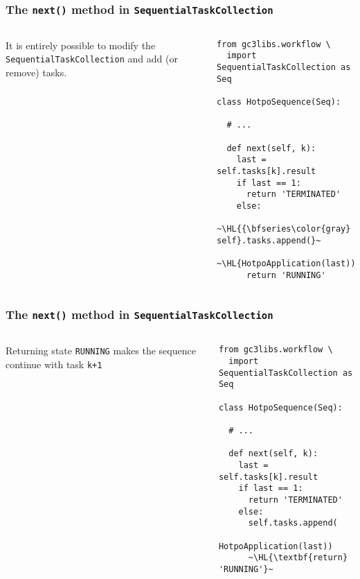 \documentclass[english,serif,mathserif,xcolor=pdftex,dvipsnames,table]{beamer}
\begin{document}
\begin{frame}[fragile]
  \frametitle{The \texttt{next()} method in \texttt{SequentialTaskCollection}}
  \label{sec:14}

  \begin{columns}
    It is entirely possible to modify the
    \texttt{SequentialTaskCollection} and add (or remove) tasks.

    \begin{lstlisting}[basicstyle=\ttfamily\footnotesize]
from gc3libs.workflow \
  import SequentialTaskCollection as Seq

class HotpoSequence(Seq):

  # ...

  def next(self, k):
    last = self.tasks[k].result
    if last == 1:
      return 'TERMINATED'
    else:
      ~\HL{{\bfseries\color{gray} self}.tasks.append(}~
        ~\HL{HotpoApplication(last))}~
      return 'RUNNING'
    \end{lstlisting}
  \end{columns}
\end{frame}


\begin{frame}[fragile]
  \frametitle{The \texttt{next()} method in \texttt{SequentialTaskCollection}}
  \label{sec:14}

  \begin{columns}
    Returning state \texttt{RUNNING} makes the sequence
    continue with task \lstinline|k+1|

    \begin{lstlisting}[basicstyle=\ttfamily\footnotesize]
from gc3libs.workflow \
  import SequentialTaskCollection as Seq

class HotpoSequence(Seq):

  # ...

  def next(self, k):
    last = self.tasks[k].result
    if last == 1:
      return 'TERMINATED'
    else:
      self.tasks.append(
        HotpoApplication(last))
      ~\HL{\textbf{return} 'RUNNING'}~
    \end{lstlisting}
  \end{columns}
\end{frame}
\end{document}
